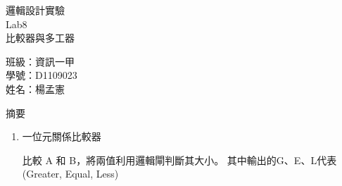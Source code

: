 \documentclass[12pt, a4paper]{article}
\begin{document}
\begin{center}
  {\Huge 邏輯設計實驗} \\[2.5cm]
  {\Huge Lab8} \\[1.5cm]
  {\Huge 比較器與多工器} \\ [4.5cm]
  \hspace{.6in}
  \begin{minipage}[t]{.4\linewidth}
    {\Large 班級：資訊一甲}\\[0.5cm]
    {\Large 學號：D1109023}\\[0.5cm]
    {\Large 姓名：楊孟憲}
  \end{minipage}    
\end{center}

\newpage

\begin{description}
  \fontsize{22pt}{25pt}\selectfont 
    \item [一、]摘要 
      \begin{enumerate}
        \fontsize{20pt}{22pt}\selectfont
          \item 一位元關係比較器\\[.5cm]
            \begin{minipage}{\linewidth}
              \fontsize{16pt}{18pt}\selectfont
              比較 A 和 B，將兩值利用邏輯閘判斷其大小。
              其中輸出的G、E、L代表(Greater, Equal, Less) \\
              \normalsize
            \end{minipage}
\end{enumerate}
\end{description}
\end{document}
